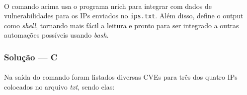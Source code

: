 \documentclass[12pt]{article}
\begin{document}
\paragraph{}

O comando acima usa o programa nrich para integrar com dados de vulnerabilidades para os IPs enviados no
\texttt{ips.txt}. Além disso, define o output como \textit{shell}, tornando mais fácil a leitura e pronto para ser
integrado a outras automações possíveis usando \textit{bash}.


\subsubsection{Solução --- \textbf{C}}

\paragraph{}

Na saída do comando foram listados diversas CVEs para três dos quatro IPs colocados no arquivo \textit{txt}, sendo elas:
\end{document}
